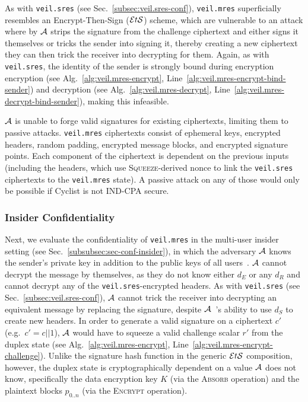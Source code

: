 As with \texttt{veil.sres} \@(see Sec.~\ref{subsec:veil.sres-conf})\@, \texttt{veil.mres}
superficially resembles an Encrypt-Then-Sign ($\mathcal{E}t\mathcal{S}$) scheme, which are vulnerable to an attack
where by $\mathcal{A}$ strips the signature from the challenge ciphertext and either signs it
themselves or tricks the sender into signing it, thereby creating a new ciphertext they can then
trick the receiver into decrypting for them. Again, as with \texttt{veil.sres}\@, the identity of
the sender is strongly bound during encryption encryption (see Alg.~\ref{alg:veil.mres-encrypt},
Line~\ref{alg:veil.mres-encrypt-bind-sender}) and decryption (see Alg.~\ref{alg:veil.mres-decrypt},
Line~\ref{alg:veil.mres-decrypt-bind-sender}), making this infeasible.

$\mathcal{A}$ is unable to forge valid signatures for existing ciphertexts, limiting them to passive
attacks. \texttt{veil.mres} ciphertexts consist of ephemeral keys, encrypted headers, random
padding, encrypted message blocks, and encrypted signature points. Each component of the ciphertext
is dependent on the previous inputs (including the headers, which use \textsc{Squeeze}\@-derived
nonce to link the \texttt{veil.sres} ciphertexts to the \texttt{veil.mres} state). A passive attack
on any of those would only be possible if Cyclist is not IND-CPA secure.

\subsubsection{Insider Confidentiality}

Next, we evaluate the confidentiality of \texttt{veil.mres} in the multi-user insider setting (see
Sec.~\ref{subsubsec:sec-conf-insider}), in which the adversary $\mathcal{A}$ knows the sender's
private key in addition to the public keys of all users~\cite[p. 45--46]{baek2010}\@. $\mathcal{A}$
cannot decrypt the message by themselves, as they do not know either $d_E$ or any $d_R$ and cannot
decrypt any of the \texttt{veil.sres}\@-encrypted headers. As with \texttt{veil.sres} (see
Sec.~\ref{subsec:veil.sres-conf})\@, $\mathcal{A}$ cannot trick the receiver into decrypting an
equivalent message by replacing the signature, despite $\mathcal{A}$~'s ability to use $d_S$ to
create new headers. In order to generate a valid signature on a ciphertext $c'$ (e.g.\ $c'=c||1$),
$\mathcal{A}$ would have to squeeze a valid challenge scalar $r'$ from the duplex state (see
Alg.~\ref{alg:veil.mres-encrypt}, Line~\ref{alg:veil.mres-encrypt-challenge}). Unlike the signature
hash function in the generic $\mathcal{E}t\mathcal{S}$ composition, however, the duplex state is cryptographically
dependent on a value $\mathcal{A}$ does not know, specifically the data encryption key $K$ \@(via the
\textsc{Absorb} operation) and the plaintext blocks $p_{0..n}$ (via the \textsc{Encrypt} operation).

